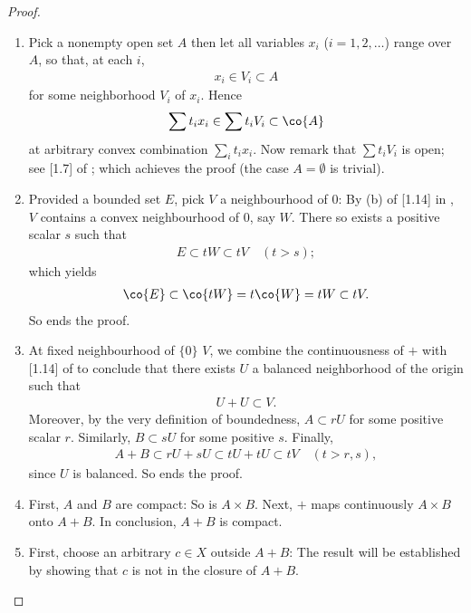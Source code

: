 \begin{proof}
\renewcommand{\labelenumi}{(\arabic{enumi})} 
\begin{enumerate}
\item 
Pick a nonempty open set $A$ then let all variables %
$\mathit{x_i}$ ($i=1, 2, \dots$) range over $A$, %
so that, at each $i$,  %
%
\begin{align}
  x_i \in V_i \subset A 
\end{align}
%
for some neighborhood $V_i$ of $x_i$. %
%
Hence 
%
\begin{align}
  \sum t_i x_i \in \sum t_i V_i  \subset \co{A}
\end{align}
%
at arbitrary convex combination $\sum_i t_i x_i$. %
Now remark that $\sum t_i V_i$ is open; see [1.7] of \cite{FA}; %
which achieves the proof (the case $A=\emptyset$ is trivial). %
%
\item Provided a bounded set $E$, %
pick $V$ a neighbourhood of $0$: By (b) of [1.14] in \cite{FA}, %
$V$ contains a convex neighbourhood of $0$, say $W$. %
%
There so exists a positive scalar $s$ such that
%
\begin{align}
  E \subset tW \subset tV \quad (t>s); 
\end{align}
%
which yields %
%
\begin{align}
  \co{E} \subset \co{tW} = t\co{W} = t W \subset tV.
\end{align}
%
So ends the proof. %
%
\item At fixed neighbourhood of $\{0\}$ $V$, %
we combine the continuousness of $+$ with [1.14] of \cite{FA} %
to conclude that there exists $U$ a balanced neighborhood of the origin %
such that %
%
\begin{align}
  U+U\subset V. 
\end{align}
%
Moreover, by the very definition of boundedness, %
$A \subset r U$ for some positive scalar $r$. %
Similarly, $B \subset s U$ for some positive $s$. %
%
Finally, 
%
\begin{align}
A+B \subset  rU + sU \subset tU + tU \subset tV \quad (t > r, s), 
\end{align}
%
since $U$ is balanced. So ends the proof. %
%
\item First, $A$ and $B$ are compact: So is $A\times B$. %
Next, $+$ maps continuously $A\times B$ onto $A+B$. %
In conclusion, $A+B$ is compact. %
%
\item First, choose an arbitrary $c\in X$ outside $A+B$: %
The result will be established by showing that $c$ is not in the closure %
of $A+B$. %

\end{enumerate}
\end{proof}
